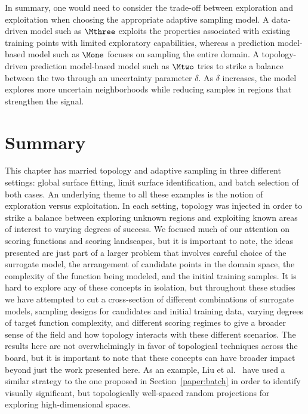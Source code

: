 In summary, one would need to consider the trade-off between exploration and exploitation when choosing the appropriate adaptive sampling model.
%
A data-driven model such as $\Mthree$ exploits the properties associated with existing training points with limited exploratory capabilities, whereas a prediction model-based model such as $\Mone$ focuses on sampling the entire domain.
%
A topology-driven prediction model-based model such as $\Mtwo$ tries to strike a balance between the two through an uncertainty parameter $\delta$.
%
As $\delta$ increases, the model explores more uncertain neighborhoods while reducing samples in regions that strengthen the signal.


\section{Summary}
This chapter has married topology and adaptive sampling in three different settings: global surface fitting, limit surface identification, and batch selection of both cases.
%
An underlying theme to all these examples is the notion of exploration versus exploitation.
%
In each setting, topology was injected in order to strike a balance between exploring unknown regions and exploiting known areas of interest to varying degrees of success.
%
We focused much of our attention on scoring functions and scoring landscapes, but it is important to note, the ideas presented are just part of a larger problem that involves careful choice of the surrogate model, the arrangement of candidate points in the domain space, the complexity of the function being modeled, and the initial training samples.
%
It is hard to explore any of these concepts in isolation, but throughout these studies we have attempted to cut a cross-section of different combinations of surrogate models, sampling designs for candidates and initial training data, varying degrees of target function complexity, and different scoring regimes to give a broader sense of the field and how topology interacts with these different scenarios.
%
The results here are not overwhelmingly in favor of topological techniques across the board, but it is important to note that these concepts can have broader impact beyond just the work presented here.
%
As an example, Liu et al.~\cite{LiuBremerJayaraman2016} have used a similar strategy to the one proposed in Section~\ref{paper:batch} in order to identify visually significant, but topologically well-spaced random projections for exploring high-dimensional spaces.

% 
